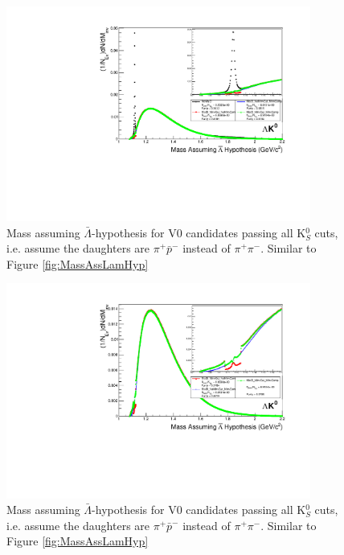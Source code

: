 \begin{figure}[h]
  \centering
  \includegraphics[width=100mm]{3_DataSelection/Figures/MassAssHypotheses/canMassAssALamHypCompare_LamK0_wNoMisID.pdf}
  \caption[$\bar{\Lambda}$ contamination in K$^{0}_{S}$ collection]{Mass assuming $\bar{\Lambda}$-hypothesis for V0 candidates passing all K$^{0}_{S}$ cuts, i.e. assume the daughters are $\pi^{+}\bar{p}^{-}$ instead of $\pi^{+}\pi^{-}$.  Similar to Figure \ref{fig:MassAssLamHyp}}
  \label{fig:MassAssALamHyp_wNoMisID}
\end{figure}

\begin{figure}[h]
  \centering
  \includegraphics[width=100mm]{3_DataSelection/Figures/MassAssHypotheses/canMassAssALamHypCompare_LamK0.pdf}
  \caption[$\bar{\Lambda}$ contamination in K$^{0}_{S}$ collection]{Mass assuming $\bar{\Lambda}$-hypothesis for V0 candidates passing all K$^{0}_{S}$ cuts, i.e. assume the daughters are $\pi^{+}\bar{p}^{-}$ instead of $\pi^{+}\pi^{-}$.  Similar to Figure \ref{fig:MassAssLamHyp}}
  \label{fig:MassAssALamHyp}
\end{figure}

